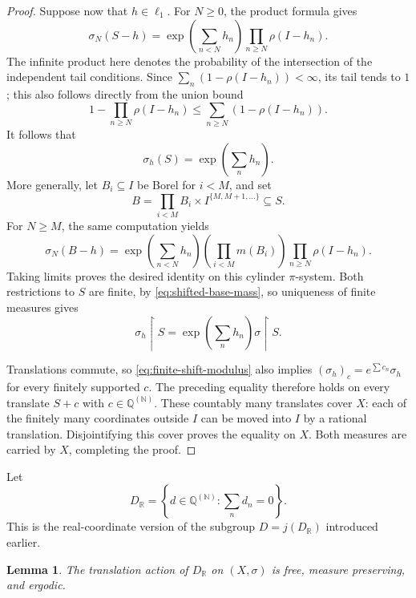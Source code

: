 \documentclass[11pt]{article}
\numberwithin{equation}{section}
\newtheorem{lemma}[theorem]{Lemma}
\theoremstyle{definition}
\newcommand{\N}{\mathbb N}
\newcommand{\R}{\mathbb R}
\newcommand{\Q}{\mathbb Q}
\begin{document}
\begin{proof}
Suppose now that $h\in\ell_1$. For $N\geq0$, the product formula gives
\[
 \sigma_N(S-h)
   =\exp\!\left(\sum_{n<N}h_n\right)
        \prod_{n\geq N}\rho(I-h_n).
\]
The infinite product here denotes the probability of the intersection
of the independent tail conditions. Since
$\sum_n(1-\rho(I-h_n))<\infty$, its tail tends to $1$; this also follows
directly from the union bound
\[
 1-\prod_{n\geq N}\rho(I-h_n)
       \leq\sum_{n\geq N}(1-\rho(I-h_n)).
\]
It follows that
\begin{equation}
 \sigma_h(S)=\exp\!\left(\sum_n h_n\right).
 \label{eq:shifted-base-mass}
\end{equation}
More generally, let $B_i\subseteq I$ be Borel for $i<M$, and set
\[
 B=\prod_{i<M}B_i\times I^{\{M,M+1,\ldots\}}\subseteq S.
\]
For $N\geq M$, the same computation yields
\[
 \sigma_N(B-h)=
 \exp\!\left(\sum_{n<N}h_n\right)
 \left(\prod_{i<M}m(B_i)\right)
 \prod_{n\geq N}\rho(I-h_n).
\]
Taking limits proves the desired identity on this cylinder
$\pi$-system. Both restrictions to $S$ are finite, by
\eqref{eq:shifted-base-mass}, so uniqueness of finite measures gives
\[
 \sigma_h\mathbin{\upharpoonright}S
   =\exp\!\left(\sum_n h_n\right)
       \sigma\mathbin{\upharpoonright}S.
\]

Translations commute, so \eqref{eq:finite-shift-modulus} also implies
$(\sigma_h)_c=e^{\sum c_n}\sigma_h$ for every finitely supported $c$.
The preceding equality therefore holds on every translate $S+c$ with
$c\in\Q^{(\N)}$. These countably many translates cover $X$: each of
the finitely many coordinates outside $I$ can be moved into $I$ by a
rational translation. Disjointifying this cover proves the equality
on $X$. Both measures are carried by $X$, completing the proof.
\end{proof}

Let
\[
 D_{\R}=\left\{d\in\Q^{(\N)}:\sum_n d_n=0\right\}.
\]
This is the real-coordinate version of the subgroup $D=j(D_{\R})$
introduced earlier.

\begin{lemma}
\label{lem:restricted-ergodicity}
The translation action of $D_{\R}$ on $(X,\sigma)$ is free, measure
preserving, and ergodic.
\end{lemma}
\end{document}
